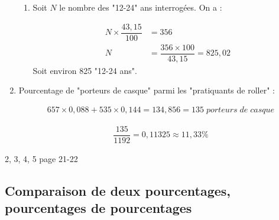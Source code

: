 \documentclass[12pt,a4paper]{article}
\begin{document}
\begin{enumerate}[label=\arabic*.]
\begin{enumerate}[label=\alph*) ]
		
		\item Soit $N$ le nombre des "12-24" ans interrogées. On a :
		
		\begin{eqnarray*}
			N \times \dfrac{43,15}{100} &= 356 \\
			N &= \dfrac{356 \times 100}{43,15} = 825,02
		\end{eqnarray*}
		Soit environ 825 "12-24 ans".
	\end{enumerate}
	
	\item Pourcentage de "porteurs de casque" parmi les "pratiquants de roller" :
	
	\begin{eqnarray*}
		657 \times 0,088 + 535 \times 0,144 = 134,856 = 135\; porteurs\; de\; casque
	\end{eqnarray*}
	
	\begin{eqnarray*}
		\dfrac{135}{1192}=0,11325 \approx 11,33 \%
	\end{eqnarray*}
\end{enumerate}



\begin{myexos}
	2, 3, 4, 5 page 21-22
\end{myexos}

\subsection{Comparaison de deux pourcentages, pourcentages de pourcentages}
\end{document}
